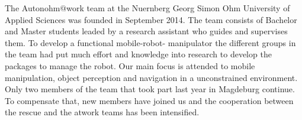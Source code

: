 The Autonohm$@$work team at the Nuernberg Georg Simon Ohm University of Applied Sciences
was founded in September 2014. The team consists of Bachelor and Master students leaded by a
research assistant who guides and supervises them. To develop a functional mobile-robot-
manipulator the different groups in the team had put much effort and knowledge into research to
develop the packages to manage the robot. Our main focus is attended to mobile manipulation,
object perception and navigation in a unconstrained environment.
Only two members of the team that took part last year in Magdeburg continue. To compensate that,
new members have joined us and the cooperation between the rescue and the atwork teams has been
intensified.